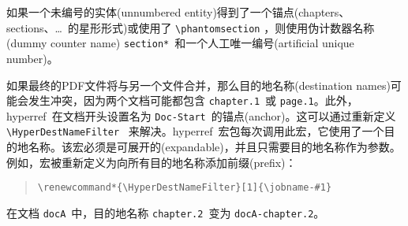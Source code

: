 \documentclass{article}
\newcommand*{\cs}[1]{%
  \texttt{\textbackslash #1}%
}
\newcommand*{\xpackage}[1]{\textsf{#1}}
\begin{document}
如果一个未编号的实体(unnumbered entity)得到了一个锚点(chapters、sections、\dots~的星形形式)或使用了 \cs{phantomsection}，则使用伪计数器名称(dummy counter name) \texttt{section*}\ 和一个人工唯一编号(artificial unique number)。

如果最终的PDF文件将与另一个文件合并，那么目的地名称(destination names)可能会发生冲突，因为两个文档可能都包含 \texttt{chapter.1}\ 或 \texttt{page.1}。此外，\xpackage{hyperref}\ 在文档开头设置名为 \texttt{Doc-Start}\ 的锚点(anchor)。这可以通过重新定义 \cs{HyperDestNameFilter}\ 来解决。\xpackage{hyperref}\ 宏包每次调用此宏，它使用了一个目的地名称。该宏必须是可展开的(expandable)，并且只需要目的地名称作为参数。例如，宏被重新定义为向所有目的地名称添加前缀(prefix)：
\begin{quote}
    \begin{verbatim}
\renewcommand*{\HyperDestNameFilter}[1]{\jobname-#1}
\end{verbatim}
\end{quote}
在文档 \texttt{docA}\ 中，目的地名称 \texttt{chapter.2}\ 变为 \texttt{docA-chapter.2}。
\end{document}
